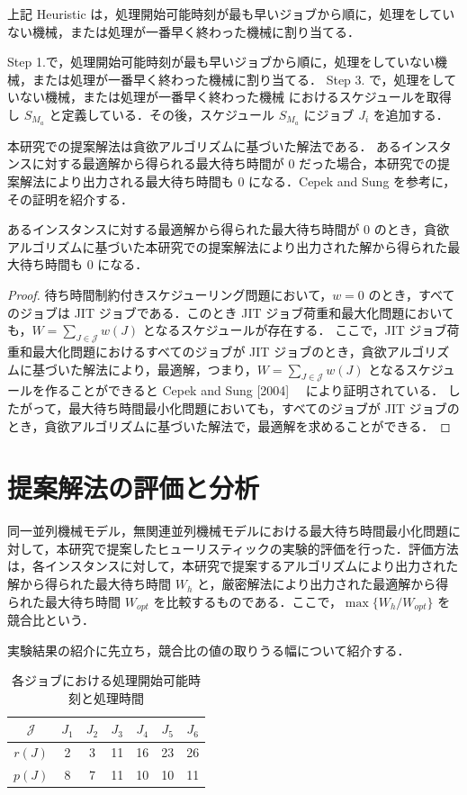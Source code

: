 \documentclass[12pt]{optlab-bachelor}
\begin{document}
上記 {\sc Heuristic} は，処理開始可能時刻が最も早いジョブから順に，処理をしていない機械，または処理が一番早く終わった機械に割り当てる．

Step 1.で，処理開始可能時刻が最も早いジョブから順に，処理をしていない機械，または処理が一番早く終わった機械に割り当てる．
Step 3. で，処理をしていない機械，または処理が一番早く終わった機械 におけるスケジュールを取得し $S_{M_a}$ と定義している．その後，スケジュール $S_{M_a}$ にジョブ $J_i$ を追加する．

本研究での提案解法は貪欲アルゴリズムに基づいた解法である．
あるインスタンスに対する最適解から得られる最大待ち時間が 0 だった場合，本研究での提案解法により出力される最大待ち時間も 0 になる．Cepek and Sung \cite{JIT} を参考に，その証明を紹介する．

\begin{lemma}
  あるインスタンスに対する最適解から得られた最大待ち時間が $0$ のとき，貪欲アルゴリズムに基づいた本研究での提案解法により出力された解から得られた最大待ち時間も $0$ になる．
\end{lemma}

\begin{proof}
  待ち時間制約付きスケジューリング問題において，$w = 0$ のとき，すべてのジョブは JIT ジョブである．このとき JIT ジョブ荷重和最大化問題においても，$W = {\displaystyle \sum_{J \in \mathcal{J}}w(J)}$ となるスケジュールが存在する．
  ここで，JIT ジョブ荷重和最大化問題におけるすべてのジョブが JIT ジョブのとき，貪欲アルゴリズムに基づいた解法により，最適解，つまり，$W = {\displaystyle \sum_{J \in \mathcal{J}}w(J)}$ となるスケジュールを作ることができると Cepek and Sung [2004] \cite{JIT}　により証明されている．
  したがって，最大待ち時間最小化問題においても，すべてのジョブが JIT ジョブのとき，貪欲アルゴリズムに基づいた解法で，最適解を求めることができる．
\end{proof}

\section{提案解法の評価と分析}\label{5_s_3}
同一並列機械モデル，無関連並列機械モデルにおける最大待ち時間最小化問題に対して，本研究で提案したヒューリスティックの実験的評価を行った．評価方法は，各インスタンスに対して，本研究で提案するアルゴリズムにより出力された解から得られた最大待ち時間 $W_h$ と，厳密解法により出力された最適解から得られた最大待ち時間 $W_{opt}$ を比較するものである．ここで，$\max\{W_h/W_{opt}\}$ を競合比という．

実験結果の紹介に先立ち，競合比の値の取りうる幅について紹介する．
\begin{table}[htb]
  \begin{center}
    \begin{tabular}{|c|c|c|c|c|c|c|} \hline
      $\mathcal{J}$ & $J_1$ & $J_2$ & $J_3$ & $J_4$ & $J_5$ & $J_6$\\
      \hline \hline
      $r(J)$ & 2 & 3 & 11 & 16 & 23 & 26 \\ \hline
      $p(J)$ & 8 & 7 & 11 & 10 & 10 & 11\\ \hline
    \end{tabular}
    \caption{各ジョブにおける処理開始可能時刻と処理時間}
  \end{center}
\end{table}
\end{document}
